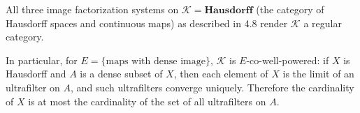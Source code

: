All three image factorization systems on $\mathcal{K} = \mathbf{Hausdorff}$ (the category of Hausdorff spaces and continuous maps) as described in 4.8 render $\mathcal{K}$ a regular category.

In particular, for $E = \{\text{maps with dense image}\}$, $\mathcal{K}$ is $E$-co-well-powered: if $X$ is Hausdorff and $A$ is a dense subset of $X$, then each element of $X$ is the limit of an ultrafilter on $A$, and such ultrafilters converge uniquely. Therefore the cardinality of $X$ is at most the cardinality of the set of all ultrafilters on $A$.
